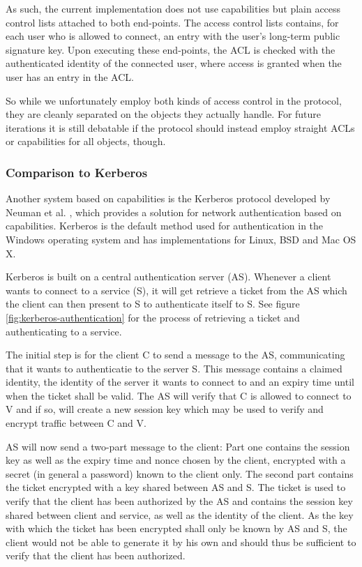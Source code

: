 As such, the current implementation does not use capabilities but plain access control lists attached to both end-points.
The access control lists contains, for each user who is allowed to connect, an entry with the user's long-term public signature key.
Upon executing these end-points, the ACL is checked with the authenticated identity of the connected user, where access is granted when the user has an entry in the ACL.

So while we unfortunately employ both kinds of access control in the protocol, they are cleanly separated on the objects they actually handle.
For future iterations it is still debatable if the protocol should instead employ straight ACLs or capabilities for all objects, though.

\subsubsection{Comparison to Kerberos}
\label{sec:kerberos}

Another system based on capabilities is the Kerberos protocol developed by Neuman et al. \cite{neuman1994kerberos,neuman2005rfc}, which provides a solution for network authentication based on capabilities.
Kerberos is the default method used for authentication in the Windows operating system and has implementations for Linux, BSD and Mac OS X.

Kerberos is built on a central authentication server (AS).
Whenever a client wants to connect to a service (S), it will get retrieve a ticket from the AS which the client can then present to S to authenticate itself to S.
See figure \ref{fig:kerberos-authentication} for the process of retrieving a ticket and authenticating to a service.

The initial step is for the client C to send a message to the AS, communicating that it wants to authenticatie to the server S.
This message contains a claimed identity, the identity of the server it wants to connect to and an expiry time until when the ticket shall be valid.
The AS will verify that C is allowed to connect to V and if so, will create a new session key which may be used to verify and encrypt traffic between C and V.

AS will now send a two-part message to the client:
Part one contains the session key as well as the expiry time and nonce chosen by the client, encrypted with a secret (in general a password) known to the client only.
The second part contains the ticket encrypted with a key shared between AS and S.
The ticket is used to verify that the client has been authorized by the AS and contains the session key shared between client and service, as well as the identity of the client.
As the key with which the ticket has been encrypted shall only be known by AS and S, the client would not be able to generate it by his own and should thus be sufficient to verify that the client has been authorized.

